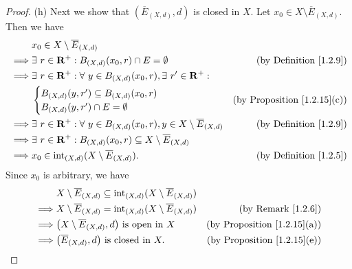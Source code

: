 \begin{proof}{(h)}
    Next we show that \((\overline{E}_{(X, d)}, d)\) is closed in \(X\).
    Let \(x_0 \in X \setminus \overline{E}_{(X, d)}\).
    Then we have
    \begin{align*}
                 & x_0 \in X \setminus \overline{E}_{(X, d)}                                                                                                          \\
        \implies & \exists\ r \in \mathbf{R}^+ : B_{(X, d)}(x_0, r) \cap E = \emptyset                                      & \text{(by Definition \ref{1.2.9})}      \\
        \implies & \exists\ r \in \mathbf{R}^+ : \forall\ y \in B_{(X, d)}(x_0, r), \exists\ r' \in \mathbf{R}^+ :                                                    \\
                 & \begin{cases}
            B_{(X, d)}(y, r') \subseteq B_{(X, d)}(x_0, r) \\
            B_{(X, d)}(y, r') \cap E = \emptyset
        \end{cases}                                                                               & \text{(by Proposition \ref{1.2.15}(c))} \\
        \implies & \exists\ r \in \mathbf{R}^+ : \forall\ y \in B_{(X, d)}(x_0, r), y \in X \setminus \overline{E}_{(X, d)} & \text{(by Definition \ref{1.2.9})}      \\
        \implies & \exists\ r \in \mathbf{R}^+ : B_{(X, d)}(x_0, r) \subseteq X \setminus \overline{E}_{(X, d)}                                                       \\
        \implies & x_0 \in \text{int}_{(X, d)}(X \setminus \overline{E}_{(X, d)}).                                          & \text{(by Definition \ref{1.2.5})}
    \end{align*}
    Since \(x_0\) is arbitrary, we have
    \begin{align*}
                 & X \setminus \overline{E}_{(X, d)} \subseteq \text{int}_{(X, d)}(X \setminus \overline{E}_{(X, d)})                                           \\
        \implies & X \setminus \overline{E}_{(X, d)} = \text{int}_{(X, d)}(X \setminus \overline{E}_{(X, d)})         & \text{(by Remark \ref{1.2.6})}          \\
        \implies & \big(X \setminus \overline{E}_{(X, d)}, d\big) \text{ is open in } X                               & \text{(by Proposition \ref{1.2.15}(a))} \\
        \implies & \big(\overline{E}_{(X, d)}, d\big) \text{ is closed in } X.                                        & \text{(by Proposition \ref{1.2.15}(e))}
    \end{align*}


\end{proof}
